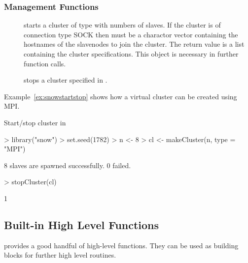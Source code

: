 \subsubsection{Management Functions}
\begin{description}
\item[]
  starts a cluster of type  with  numbers of
  slaves. If the cluster is of connection type SOCK then 
  must be a charactor vector containing the hostnames of the
  slavenodes to join the cluster. The return value is a list
  containing the cluster specifications. This object is necessary in
  further function calls.
\item[] stops a cluster specified in .
\end{description}

Example~\ref{ex:snowstartstop} shows how a virtual cluster can be
created using MPI. 

\begin{Example} Start/stop cluster in 
\begin{Schunk}
\begin{Sinput}
> library("snow")
> set.seed(1782)
> n <- 8
> cl <- makeCluster(n, type = "MPI")
\end{Sinput}
\begin{Soutput}
	8 slaves are spawned successfully. 0 failed.
\end{Soutput}
\begin{Sinput}
> stopCluster(cl)
\end{Sinput}
\begin{Soutput}
[1] 1
\end{Soutput}
\end{Schunk}
\label{ex:snowstartstop}
\end{Example}

\subsection{Built-in High Level Functions}

 provides a good handful of high-level functions. They can
be used as building blocks for further high level routines.

